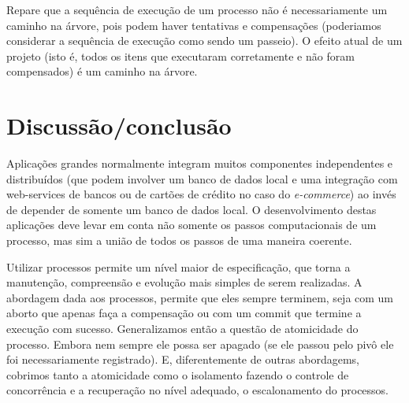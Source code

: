 \documentclass[a4paper,12pt,notitlepage]{article}
\begin{document}
Repare que a sequência de execução de um processo não é necessariamente um caminho na árvore, pois podem haver tentativas e compensações (poderiamos considerar a sequência de execução como sendo um passeio). O efeito atual de um projeto (isto é, todos os itens que executaram corretamente e não foram compensados) é um caminho na árvore.

\section{Discussão/conclusão}

Aplicações grandes normalmente integram muitos componentes independentes e distribuídos (que podem involver um banco de dados local e uma integração com web-services de bancos ou de cartões de crédito no caso do \textit{e-commerce}) ao invés de depender de 
somente um banco de dados local. O desenvolvimento destas aplicações deve levar em conta não somente os passos computacionais de um processo, mas sim a união de todos os passos de uma maneira coerente. 

Utilizar processos permite um nível maior de especificação, que torna a manutenção, compreensão e evolução mais simples de serem realizadas. A abordagem dada aos processos, permite que eles sempre terminem, seja com um aborto que apenas faça a compensação ou com um commit que termine a execução com sucesso. Generalizamos então a questão de atomicidade do processo. Embora nem sempre ele possa ser apagado (se ele passou pelo pivô ele foi necessariamente registrado). E, diferentemente de outras abordagems, cobrimos tanto a atomicidade como o isolamento fazendo o controle de concorrência e a recuperação no nível adequado, o escalonamento do processos.


\newpage



 






{}

\end{document}
